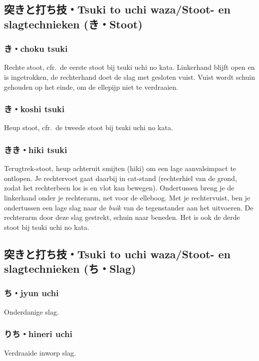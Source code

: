 \subsection{突きと打ち技・Tsuki to uchi waza/Stoot- en slagtechnieken ({\bfseries{}き・Stoot})}
\subsubsection{き・choku tsuki}
Rechte stoot, cfr.\ de eerste stoot bij tsuki uchi no kata. Linkerhand blijft open en is ingetrokken, de rechterhand doet de slag met gesloten vuist. Vuist wordt schuin gehouden op het einde, om de ellepijp niet te verdraaien.

\subsubsection{き・koshi tsuki}
Heup stoot, cfr.\ de tweede stoot bij tsuki uchi no kata.

\subsubsection{きき・hiki tsuki}
Terugtrek-stoot, heup achteruit smijten (hiki) om een lage aanvalsimpact te ontlopen. Je rechtervoet gaat daarbij in cat-stand (rechterhiel van de grond, zodat het rechterbeen los is en vlot kan bewegen). Ondertussen breng je de linkerhand onder je rechterarm, net voor de elleboog. Met je rechtervuist, ben je ondertussen een lage slag naar de \textit{buik} van de tegenstander aan het uitvoeren. De rechterarm door deze slag gestrekt, schuin naar beneden. Het is ook de derde stoot bij tsuki uchi no kata.

\subsection{突きと打ち技・Tsuki to uchi waza/Stoot- en slagtechnieken ({\bfseries{}ち・Slag})}
\subsubsection{ち・jyun uchi}
Onderdanige slag.

\subsubsection{りち・hineri uchi}
Verdraaide inworp slag.

